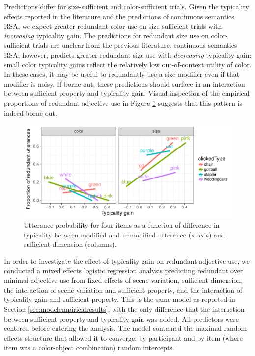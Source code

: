\documentclass[11pt]{article}
\newcommand{\figref}[1]{Figure \ref{#1}}
\newcommand{\sectionref}[1]{Section \ref{#1}}
\begin{document}
Predictions differ for size-sufficient and color-sufficient trials. Given the typicality effects reported in the literature and the predictions of continuous semantics RSA, we expect greater redundant color use on size-sufficient trials with \emph{increasing} typicality gain. The predictions for redundant size use on color-sufficient trials are unclear from the previous literature. continuous semantics RSA, however,  predicts greater redundant size use with \emph{decreasing} typicality gain: small color typicality gains reflect the relatively low out-of-context utility of color. In these cases, it may be useful to redundantly use a size modifier even if that modifier is noisy. If borne out, these predictions should surface in an interaction between sufficient property and typicality gain. Visual inspection of the empirical proportions of redundant adjective use in \figref{fig:maxtypicalitydiff} suggests that this pattern is indeed borne out.

\begin{figure}
\centering
\includegraphics[width=.9\textwidth]{pics/maxtypicalitydiff}
\caption{Utterance probability for four items as a function of difference in typicality between modified and unmodified utterance (x-axis) and sufficient dimension (columns). }
\label{fig:maxtypicalitydiff}
\end{figure}

In order to investigate the effect of typicality gain on redundant adjective use, we conducted a mixed effects logistic regression analysis predicting redundant over minimal adjective use from fixed effects of scene variation, sufficient dimension, the interaction of scene variation and sufficient property, and the interaction of typicality gain and sufficient property. This is the same model as reported in \sectionref{sec:modelempiricalresults}, with the only difference that the interaction between sufficient property and typicality gain was added. All predictors were centered before entering the analysis. The model contained the maximal random effects structure that allowed it to converge: by-participant and by-item (where item was a color-object combination) random intercepts. 
\end{document}
